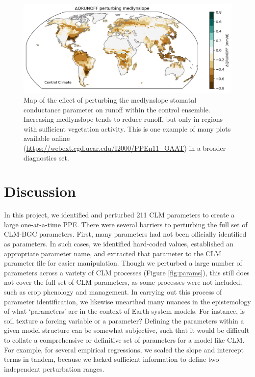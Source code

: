 \documentclass[draft]{agujournal2019}
\begin{document}
\begin{figure}[h]
\centering
\includegraphics[width=\textwidth]{../figs/QRUNOFFabs_x_medlynslope_CTL2010.png}
\caption{Map of the effect of perturbing the medlynslope stomatal conductance parameter on runoff within the control ensemble. Increasing medlynslope tends to reduce runoff, but only in regions with sufficient vegetation activity. This is one example of many plots available online (\url{https://webext.cgd.ucar.edu/I2000/PPEn11_OAAT}) in a broader diagnostics set. }
\label{fig:map}
\end{figure}

\section{Discussion}

In this project, we identified and perturbed 211 CLM parameters to create a large one-at-a-time PPE. There were several barriers to perturbing the full set of CLM-BGC parameters. First, many parameters had not been officially identified as parameters. In such cases, we identified hard-coded values, established an appropriate parameter name, and extracted that parameter to the CLM parameter file for easier manipulation. Though we perturbed a large number of parameters across a variety of CLM processes (Figure \ref{fig:params}), this still does not cover the full set of CLM parameters, as some processes were not included, such as crop phenology and management. In carrying out this process of parameter identification, we likewise unearthed many nuances in the epistemology of what `parameters' are in the context of Earth system models. For instance, is soil texture a forcing variable or a parameter? Defining the parameters within a given model structure can be somewhat subjective, such that it would be difficult to collate a comprehensive or definitive set of parameters for a model like CLM. For example, for several empirical regressions, we scaled the slope and intercept terms in tandem, because we lacked sufficient information to define two independent perturbation ranges.
\end{document}
